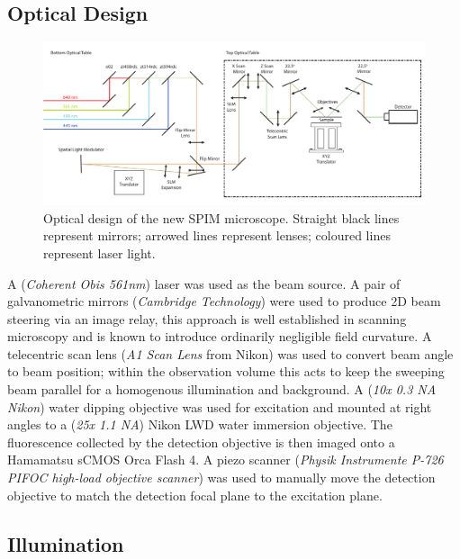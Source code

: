\subsection{Optical Design}

\begin{landscape}
  \begin{figure}
  \centering
  \includegraphics[width=\linewidth]{Figures/opticaldesign}
  \caption[Full optical design of new SPIM]{Optical design of the new SPIM microscope.
  Straight black lines represent mirrors; arrowed lines represent lenses; coloured lines represent laser light.}
  \label{fig:opticaldesign}
  \end{figure}
\end{landscape}

A (\emph{Coherent Obis 561nm}) laser was used as the beam source.
A pair of galvanometric mirrors (\emph{Cambridge Technology}) were used to produce 2D beam steering via an image relay, this approach is well established in scanning microscopy and is known to introduce ordinarily negligible field curvature.
A telecentric scan lens (\emph{A1 Scan Lens} from Nikon) was used to convert beam angle to beam position; %
within the observation volume this acts to keep the sweeping beam parallel for a homogenous illumination and background.
A (\emph{10x 0.3 NA Nikon}) water dipping objective was used for excitation and mounted at right angles to a (\emph{25x 1.1 NA}) Nikon LWD water immersion objective.
The fluorescence collected by the detection objective is then imaged onto a Hamamatsu sCMOS Orca Flash 4.
A piezo scanner (\emph{Physik Instrumente P-726 PIFOC high-load objective scanner}) was used to manually move the detection objective to match the detection focal plane to the excitation plane.


\subsection{Illumination}


